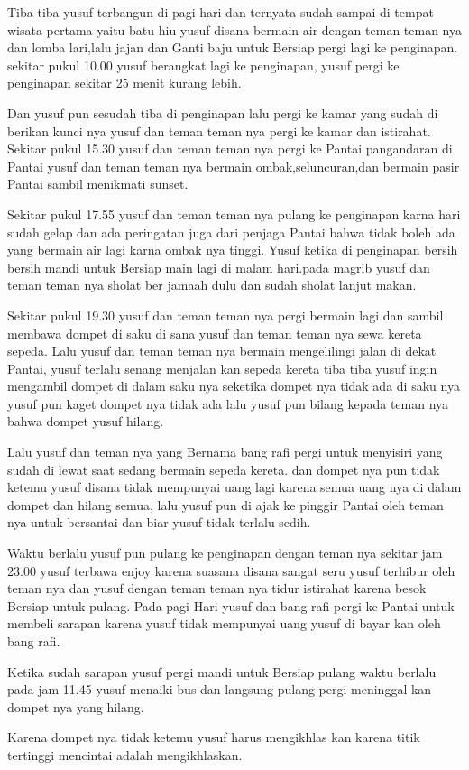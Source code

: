  Tiba tiba yusuf terbangun di pagi hari dan ternyata sudah sampai di tempat wisata pertama yaitu batu hiu yusuf disana bermain air dengan teman teman nya dan lomba lari,lalu jajan dan Ganti baju untuk Bersiap pergi lagi ke penginapan. sekitar pukul 10.00 yusuf berangkat lagi ke penginapan, yusuf pergi ke penginapan sekitar 25 menit kurang lebih.

 
Dan yusuf pun sesudah tiba di penginapan lalu pergi ke kamar yang sudah di berikan kunci nya yusuf dan teman teman nya pergi ke kamar dan istirahat. Sekitar pukul 15.30 yusuf dan teman teman nya pergi ke Pantai pangandaran di Pantai yusuf dan teman teman nya bermain ombak,seluncuran,dan bermain pasir Pantai sambil menikmati sunset.


Sekitar pukul 17.55 yusuf dan teman teman nya pulang ke penginapan karna hari sudah gelap dan ada peringatan juga dari penjaga Pantai bahwa tidak boleh ada yang bermain air lagi karna  ombak nya tinggi. Yusuf ketika di penginapan bersih bersih mandi untuk Bersiap main lagi di malam hari.pada magrib yusuf dan teman teman nya sholat ber jamaah dulu dan sudah sholat lanjut makan.


Sekitar  pukul 19.30 yusuf dan teman teman nya pergi bermain lagi dan sambil membawa dompet di saku di sana yusuf dan teman teman nya sewa kereta sepeda. Lalu yusuf dan teman teman nya bermain mengelilingi jalan di dekat Pantai, yusuf terlalu senang menjalan kan sepeda kereta tiba tiba yusuf ingin mengambil dompet di dalam saku nya seketika dompet nya tidak ada di saku nya yusuf pun kaget dompet nya tidak ada lalu yusuf pun bilang kepada teman nya bahwa dompet yusuf hilang.


 Lalu yusuf dan teman nya yang Bernama bang rafi pergi untuk menyisiri yang sudah di lewat saat sedang bermain sepeda kereta. dan dompet nya pun tidak ketemu yusuf disana tidak mempunyai uang lagi karena semua uang nya di dalam dompet dan hilang semua, lalu yusuf pun di ajak ke pinggir Pantai oleh teman nya untuk bersantai dan biar yusuf tidak terlalu sedih.

 
Waktu berlalu yusuf pun pulang ke penginapan dengan teman nya sekitar jam 23.00 yusuf terbawa enjoy karena suasana disana sangat seru yusuf terhibur oleh teman nya dan yusuf dengan teman teman nya tidur istirahat karena besok Bersiap untuk pulang. Pada pagi Hari yusuf dan bang rafi pergi ke Pantai untuk membeli sarapan karena yusuf tidak mempunyai uang yusuf di bayar kan oleh bang rafi.


Ketika sudah sarapan yusuf pergi mandi untuk Bersiap pulang waktu berlalu pada jam 11.45 yusuf menaiki bus dan langsung pulang pergi meninggal kan dompet nya yang hilang.


Karena dompet nya tidak ketemu yusuf harus mengikhlas kan karena titik tertinggi mencintai adalah mengikhlaskan.

\jedahias

